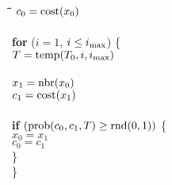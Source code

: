 \begin{tabbing}
	\qquad\=\qquad\=\qquad\=\qquad\=\kill
	$c_0 = \mathrm{cost}(x_0)$\\
	\\
	\textbf{for} ($i=1$, $i\leq i_{\mathrm{max}}$) \{\\
		\>$T = \mathrm{temp}(T_0,i,i_{\mathrm{max}})$\\
		\\
		\>$x_1 = \mathrm{nbr}(x_0)$\\
		\>$c_1 = \mathrm{cost}(x_1)$\\
		\\
		\>\textbf{if} $(\mathrm{prob}(c_0, c_1, T) \geq \mathrm{rnd}(0,1))$ \{\\
			\>\>$x_0 = x_1$\\
			\>\>$c_0 = c_1$\\
		\>\}\\
	\}
\end{tabbing}